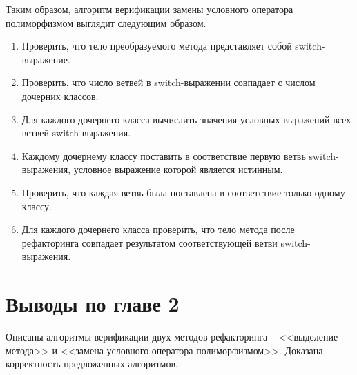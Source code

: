 Таким образом, алгоритм верификации замены условного оператора полиморфизмом выглядит следующим образом.
\begin{enumerate}
    \item Проверить, что тело преобразуемого метода представляет собой switch-выражение.
    \item Проверить, что число ветвей в switch-выражении совпадает с числом дочерних классов.
    \item Для каждого дочернего класса вычислить значения условных выражений всех ветвей switch-выражения.
    \item Каждому дочернему классу поставить в соответствие первую ветвь switch-выражения, условное выражение которой является истинным.
    \item Проверить, что каждая ветвь была поставлена в соответствие только одному классу.
    \item Для каждого дочернего класса проверить, что тело метода после рефакторинга совпадает результатом соответствующей ветви switch-выражения.
\end{enumerate}
\section*{Выводы по главе 2}
Описаны алгоритмы верификации двух методов рефакторинга -- <<выделение метода>> и <<замена условного оператора полиморфизмом>>.
Доказана корректность предложенных алгоритмов.